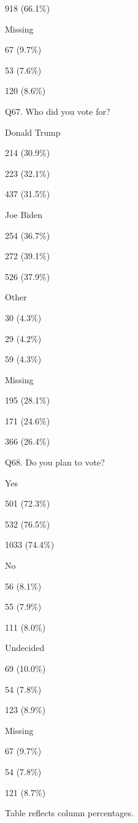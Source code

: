 \documentclass[
  11pt,
  a4paper,
]{article}
\begin{document}
\begin{table}
{918 (66.1\%)

Missing

67 (9.7\%)

53 (7.6\%)

120 (8.6\%)

Q67. Who did you vote for?

Donald Trump

214 (30.9\%)

223 (32.1\%)

437 (31.5\%)

Joe Biden

254 (36.7\%)

272 (39.1\%)

526 (37.9\%)

Other

30 (4.3\%)

29 (4.2\%)

59 (4.3\%)

Missing

195 (28.1\%)

171 (24.6\%)

366 (26.4\%)

Q68. Do you plan to vote?

Yes

501 (72.3\%)

532 (76.5\%)

1033 (74.4\%)

No

56 (8.1\%)

55 (7.9\%)

111 (8.0\%)

Undecided

69 (10.0\%)

54 (7.8\%)

123 (8.9\%)

Missing

67 (9.7\%)

54 (7.8\%)

121 (8.7\%)

Table reflects column percentages.

}

\end{table}%
\end{document}
